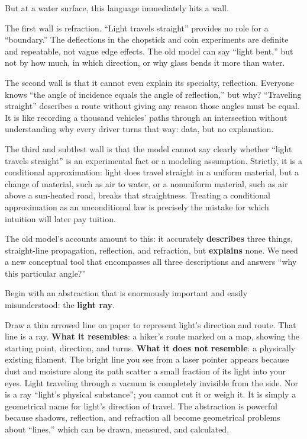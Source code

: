 But at a water surface, this language immediately hits a wall.

The first wall is refraction. ``Light travels straight'' provides no role for a ``boundary.'' The deflections in the chopstick and coin experiments are definite and repeatable, not vague edge effects. The old model can say ``light bent,'' but not by how much, in which direction, or why glass bends it more than water.

The second wall is that it cannot even explain its specialty, reflection. Everyone knows ``the angle of incidence equals the angle of reflection,'' but why? ``Traveling straight'' describes a route without giving any reason those angles must be equal. It is like recording a thousand vehicles' paths through an intersection without understanding why every driver turns that way: data, but no explanation.

The third and subtlest wall is that the model cannot say clearly whether ``light travels straight'' is an experimental fact or a modeling assumption. Strictly, it is a conditional approximation: light does travel straight in a uniform material, but a change of material, such as air to water, or a nonuniform material, such as air above a sun-heated road, breaks that straightness. Treating a conditional approximation as an unconditional law is precisely the mistake for which intuition will later pay tuition.

\begin{mainline}
The old model's accounts amount to this: it accurately \textbf{describes} three things, straight-line propagation, reflection, and refraction, but \textbf{explains} none. We need a new conceptual tool that encompasses all three descriptions and answers ``why this particular angle?''
\end{mainline}


Begin with an abstraction that is enormously important and easily misunderstood: the \textbf{light ray}.

Draw a thin arrowed line on paper to represent light's direction and route. That line is a ray. \textbf{What it resembles}: a hiker's route marked on a map, showing the starting point, direction, and turns. \textbf{What it does not resemble}: a physically existing filament. The bright line you see from a laser pointer appears because dust and moisture along its path scatter a small fraction of its light into your eyes. Light traveling through a vacuum is completely invisible from the side. Nor is a ray ``light's physical substance''; you cannot cut it or weigh it. It is simply a geometrical name for light's direction of travel. The abstraction is powerful because shadows, reflection, and refraction all become geometrical problems about ``lines,'' which can be drawn, measured, and calculated.

